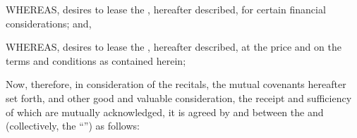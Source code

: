 
WHEREAS, \lessor desires to lease the \premises, hereafter described, for certain financial considerations; and,

WHEREAS, \lessee desires to lease the \premises, hereafter described, at the price and on the terms and conditions as contained herein;

Now, therefore, in consideration of the recitals, the mutual covenants hereafter set forth, and other good and valuable consideration, the receipt and sufficiency of which are mutually acknowledged, it is agreed by and between the \lessor and \lessee (collectively, the ``'') as follows:
